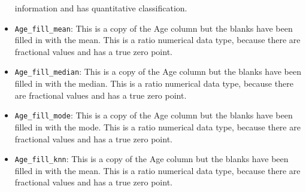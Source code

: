 \documentclass[a4paper, twocolumn]{article}
\begin{document}
\begin{itemize}
    information and has quantitative classification.
    \item \texttt{Age\_fill\_mean}: This is a copy of the Age column
    but the blanks have been filled in with the mean.
    This is a ratio numerical data type, because there are 
    fractional values and has a true zero point.
    \item \texttt{Age\_fill\_median}: This is a copy of the Age
    column but the blanks have been filled in with the median.
    This is a ratio numerical data type, because there are 
    fractional values and has a true zero point.
    \item \texttt{Age\_fill\_mode}: This is a copy of the Age column
    but the blanks have been filled in with the mode.
    This is a ratio numerical data type, because there are 
    fractional values and has a true zero point.
    \item \texttt{Age\_fill\_knn}: This is a copy of the Age column
    but the blanks have been filled in with the mean.
    This is a ratio numerical data type, because there are 
    fractional values and has a true zero point.
    
\end{itemize}
\end{document}
